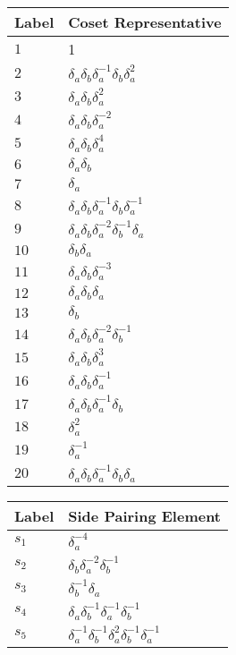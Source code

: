 \documentclass{article}
\begin{document}

\begin{center}
\begin{tabular}{ll}
\toprule
Label & Coset Representative\\
\midrule
$1$ & 1 \\
$2$ & $\delta_a^{}\delta_b^{}\delta_a^{-1}\delta_b^{}\delta_a^{2}$ \\
$3$ & $\delta_a^{}\delta_b^{}\delta_a^{2}$ \\
$4$ & $\delta_a^{}\delta_b^{}\delta_a^{-2}$ \\
$5$ & $\delta_a^{}\delta_b^{}\delta_a^{4}$ \\
$6$ & $\delta_a^{}\delta_b^{}$ \\
$7$ & $\delta_a^{}$ \\
$8$ & $\delta_a^{}\delta_b^{}\delta_a^{-1}\delta_b^{}\delta_a^{-1}$ \\
$9$ & $\delta_a^{}\delta_b^{}\delta_a^{-2}\delta_b^{-1}\delta_a^{}$ \\
$10$ & $\delta_b^{}\delta_a^{}$ \\
$11$ & $\delta_a^{}\delta_b^{}\delta_a^{-3}$ \\
$12$ & $\delta_a^{}\delta_b^{}\delta_a^{}$ \\
$13$ & $\delta_b^{}$ \\
$14$ & $\delta_a^{}\delta_b^{}\delta_a^{-2}\delta_b^{-1}$ \\
$15$ & $\delta_a^{}\delta_b^{}\delta_a^{3}$ \\
$16$ & $\delta_a^{}\delta_b^{}\delta_a^{-1}$ \\
$17$ & $\delta_a^{}\delta_b^{}\delta_a^{-1}\delta_b^{}$ \\
$18$ & $\delta_a^{2}$ \\
$19$ & $\delta_a^{-1}$ \\
$20$ & $\delta_a^{}\delta_b^{}\delta_a^{-1}\delta_b^{}\delta_a^{}$ \\
\bottomrule
\end{tabular}
\hfill
\begin{tabular}{ll}
\toprule
Label & Side Pairing Element\\
\midrule
$s_{1}$ & $\delta_a^{-4}$ \\
$s_{2}$ & $\delta_b^{}\delta_a^{-2}\delta_b^{-1}$ \\
$s_{3}$ & $\delta_b^{-1}\delta_a^{}$ \\
$s_{4}$ & $\delta_a^{}\delta_b^{-1}\delta_a^{-1}\delta_b^{-1}$ \\
$s_{5}$ & $\delta_a^{-1}\delta_b^{-1}\delta_a^{2}\delta_b^{-1}\delta_a^{-1}$ \\

\end{tabular}
\end{center}
\end{document}
